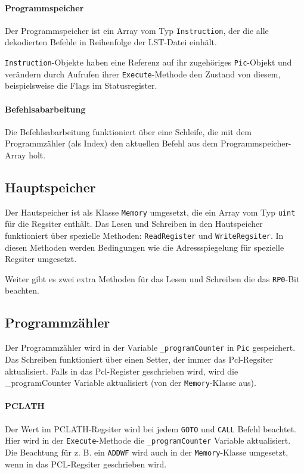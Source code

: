 \paragraph{Programmspeicher}
Der Programmspeicher ist ein Array vom Typ \texttt{Instruction},
der die alle dekodierten Befehle in Reihenfolge der LST-Datei einhält. 

\texttt{Instruction}-Objekte haben eine Referenz auf ihr zugehöriges \texttt{Pic}-Objekt
und verändern durch Aufrufen ihrer \texttt{Execute}-Methode den Zustand von diesem,
beispielsweise die Flags im Statusregister.


\paragraph{Befehlsabarbeitung}
Die Befehlsabarbeitung funktioniert über eine Schleife,
die mit dem Programmzähler (als Index) den aktuellen Befehl aus dem Programmspeicher-Array holt.


\subsection{Hauptspeicher}
Der Hautspeicher ist als Klasse \texttt{Memory} umgesetzt,
die ein Array vom Typ \texttt{uint} für die Regsiter enthält.
Das Lesen und Schreiben in den Hautspeicher funktioniert über spezielle Methoden: \texttt{ReadRegister} und \texttt{WriteRegsiter}.
In diesen Methoden werden Bedingungen wie die Adressspiegelung für spezielle Regsiter umgesetzt.


Weiter gibt es zwei extra Methoden für das Lesen und Schreiben die das \texttt{RP0}-Bit beachten. 


\subsection{Programmzähler}
Der Programmzähler wird in der Variable \texttt{\_programCounter} in \texttt{Pic} gespeichert.
Das Schreiben funktioniert über einen Setter,
der immer das Pcl-Regsiter aktualisiert.
Falls in das Pcl-Register geschrieben wird,
wird die \_programCounter Variable aktualisiert (von der \texttt{Memory}-Klasse aus).

\paragraph{PCLATH}
Der Wert im PCLATH-Regsiter wird bei jedem \texttt{GOTO} und \texttt{CALL} Befehl beachtet.
Hier wird in der \texttt{Execute}-Methode die \texttt{\_programCounter} Variable aktualisiert.
Die Beachtung für z. B. ein \texttt{ADDWF} wird auch in der \texttt{Memory}-Klasse umgesetzt,
wenn in das PCL-Regsiter geschrieben wird. 


